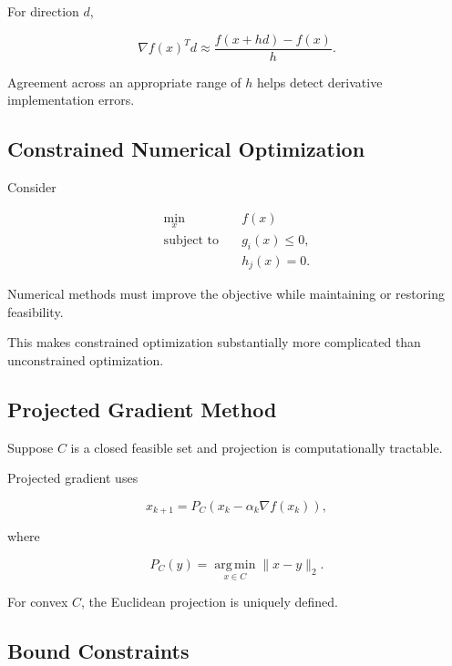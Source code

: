 For direction \(d\),

\[
\boxed{
\nabla f(x)^Td
\approx
\frac{
f(x+hd)-f(x)
}{
h
}.
}
\]

Agreement across an appropriate range of \(h\) helps detect derivative
implementation errors.

\subsection{Constrained Numerical Optimization}
\label{subsec:constrained-numerical-optimization}

Consider

\[
\boxed{
\begin{aligned}
\min_x
\quad&
f(x)
\\
\text{subject to}
\quad&
g_i(x)\leq0,
\\
&
h_j(x)=0.
\end{aligned}
}
\]

Numerical methods must improve the objective while maintaining or
restoring feasibility.

This makes constrained optimization substantially more complicated than
unconstrained optimization.

\subsection{Projected Gradient Method}
\label{subsec:projected-gradient-method}

Suppose \(C\) is a closed feasible set and projection is computationally
tractable.

Projected gradient uses

\[
\boxed{
x_{k+1}
=
P_C
\left(
x_k
-
\alpha_k
\nabla f(x_k)
\right),
}
\]

where

\[
\boxed{
P_C(y)
=
\operatorname*{arg\,min}_{x\in C}
\|x-y\|_2.
}
\]

For convex \(C\), the Euclidean projection is uniquely defined.

\subsection{Bound Constraints}
\label{subsec:bound-constrained-optimization}

